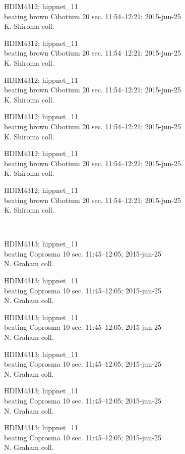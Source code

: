 \documentclass[2pt]{extarticle}
\begin{document}
\noindent
\parbox{0.16\textwidth}{\tiny \raggedright \rule[-0.3\baselineskip]{0pt}{10pt}HDIM4312; hippnet\_11\\ beating brown Cibotium 20 sec. 11:54--12:21; 2015-jun-25\\ K. Shiroma coll.}
\parbox{0.16\textwidth}{\tiny \raggedright \rule[-0.3\baselineskip]{0pt}{10pt}HDIM4312; hippnet\_11\\ beating brown Cibotium 20 sec. 11:54--12:21; 2015-jun-25\\ K. Shiroma coll.}
\parbox{0.16\textwidth}{\tiny \raggedright \rule[-0.3\baselineskip]{0pt}{10pt}HDIM4312; hippnet\_11\\ beating brown Cibotium 20 sec. 11:54--12:21; 2015-jun-25\\ K. Shiroma coll.}
\parbox{0.16\textwidth}{\tiny \raggedright \rule[-0.3\baselineskip]{0pt}{10pt}HDIM4312; hippnet\_11\\ beating brown Cibotium 20 sec. 11:54--12:21; 2015-jun-25\\ K. Shiroma coll.}
\parbox{0.16\textwidth}{\tiny \raggedright \rule[-0.3\baselineskip]{0pt}{10pt}HDIM4312; hippnet\_11\\ beating brown Cibotium 20 sec. 11:54--12:21; 2015-jun-25\\ K. Shiroma coll.}
\parbox{0.16\textwidth}{\tiny \raggedright \rule[-0.3\baselineskip]{0pt}{10pt}HDIM4312; hippnet\_11\\ beating brown Cibotium 20 sec. 11:54--12:21; 2015-jun-25\\ K. Shiroma coll.} \\ 
\vspace{0.001in} 

\noindent
\parbox{0.16\textwidth}{\tiny \raggedright \rule[-0.3\baselineskip]{0pt}{10pt}HDIM4313; hippnet\_11\\ beating Coprosma 10 sec. 11:45--12:05; 2015-jun-25\\ N. Graham coll.}
\parbox{0.16\textwidth}{\tiny \raggedright \rule[-0.3\baselineskip]{0pt}{10pt}HDIM4313; hippnet\_11\\ beating Coprosma 10 sec. 11:45--12:05; 2015-jun-25\\ N. Graham coll.}
\parbox{0.16\textwidth}{\tiny \raggedright \rule[-0.3\baselineskip]{0pt}{10pt}HDIM4313; hippnet\_11\\ beating Coprosma 10 sec. 11:45--12:05; 2015-jun-25\\ N. Graham coll.}
\parbox{0.16\textwidth}{\tiny \raggedright \rule[-0.3\baselineskip]{0pt}{10pt}HDIM4313; hippnet\_11\\ beating Coprosma 10 sec. 11:45--12:05; 2015-jun-25\\ N. Graham coll.}
\parbox{0.16\textwidth}{\tiny \raggedright \rule[-0.3\baselineskip]{0pt}{10pt}HDIM4313; hippnet\_11\\ beating Coprosma 10 sec. 11:45--12:05; 2015-jun-25\\ N. Graham coll.}
\parbox{0.16\textwidth}{\tiny \raggedright \rule[-0.3\baselineskip]{0pt}{10pt}HDIM4313; hippnet\_11\\ beating Coprosma 10 sec. 11:45--12:05; 2015-jun-25\\ N. Graham coll.} \\ 
\vspace{0.001in} 
\end{document}
